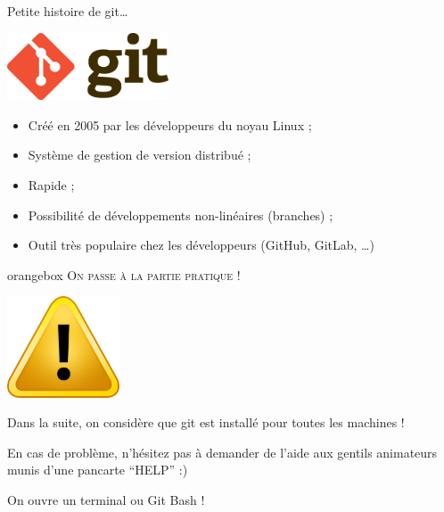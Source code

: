 \documentclass[usepdftitle=false]{beamer}
\begin{document}
\begin{frame}{Petite histoire de git\ldots}

\begin{center}
\includegraphics[height=2cm]{./imgs/logo_git.png}
\end{center}

\begin{itemize}
\item Créé en 2005 par les développeurs du noyau Linux ;
\item Système de gestion de version distribué ;
\item Rapide ;
\item Possibilité de développements non-linéaires (branches) ;
\item Outil très populaire chez les développeurs (GitHub, GitLab, \ldots)
\end{itemize}
\end{frame}

\begin{frame}
\begin{beamercolorbox}[sep=5pt,center,rounded=true,shadow=true]{orangebox}
\Large
\textsc{On passe à la partie pratique !}
\end{beamercolorbox}
\begin{center}
\includegraphics[height=3cm]{./imgs/warning.jpg}
\end{center}

\centering
Dans la suite, on considère que git est installé pour toutes les machines !

\medskip

\centering
En cas de problème, n'hésitez pas à demander de l'aide aux gentils animateurs munis d'une pancarte \enquote{HELP} :)

\begin{block}{}
\centering
On ouvre un terminal ou Git Bash !
\end{block}
\end{frame}
\end{document}
